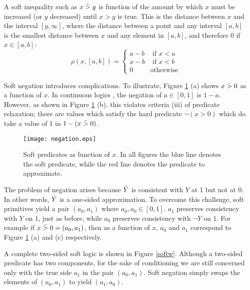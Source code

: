 A soft inequality such as $x \mathrel{\tilde{>}} y$ is function of the amount by which $x$ must be increased (or $y$ decreased) until $x > y$ is true.
This is the distance between $x$ and the interval $[y, \infty]$, where the distance between a point and any interval $[a, b]$ is the smallest distance between $x$ and any element in $[a, b]$, and therefore 0 if $x \in [a, b]$:
\begin{equation}
\rho(x, [a, b]) =
\begin{cases}
  a - b & \text{ if } x < a\\
  x - b & \text{ if } x < b\\
  0              & \text{otherwise}
\end{cases}
\end{equation}

Soft negation introduces complications.
To illustrate, Figure \ref{negationimg} (a) shows $x \mathrel{\tilde{>}} 0$ as a function of $x$.
In continuous logics \cite{kimmig2012short}, the negation of $a \in [0, 1]$ is $1 - a$.
However, as shown in Figure \ref{negationimg} (b), this violates criteria (iii) of predicate relaxation; there are values which satisfy the hard predicate $\neg(x > 0)$ which do take a value of 1 in $1 - (x \mathrel{\tilde{>}} 0)$.


\begin{figure}
\texttt{[image: negation.eps]}
\caption{Soft predicates as function of $x$.  In all figures the blue line denotes the soft predicate, while the red line denotes the predicate to approximate.}\label{negationimg}
\end{figure}


The problem of negation arises because $\tilde{Y}$ is consistent with $Y$ at 1 but not at 0.
In other words, $\tilde{Y}$ is a one-sided approximation.
To overcome this challenge, soft primitives yield a pair $(a_0, a_1)$ where $a_0, a_0 \in [0, 1]$.
$a_1$ preserves consistency with $Y$ on $1$, just as before, while $a_0$ preserves consistency with $\neg Y$ on $1$.
For example if $x \mathrel{\tilde{>}} 0 = (a_0, a_1)$, then as a function of $x$, $a_0$ and $a_1$ correspond to Figure \ref{negationimg} (a) and (c) respectively.

A complete two-sided soft logic is shown in Figure \ref{softw}.
Although a two-sided predicate has two components, for the sake of conditioning we are still concerned only with the true side $a_1$ in the pair $(a_0, a_1)$.
Soft negation simply swaps the elements of $(a_0, a_1)$ to yield $(a_1, a_0)$.


